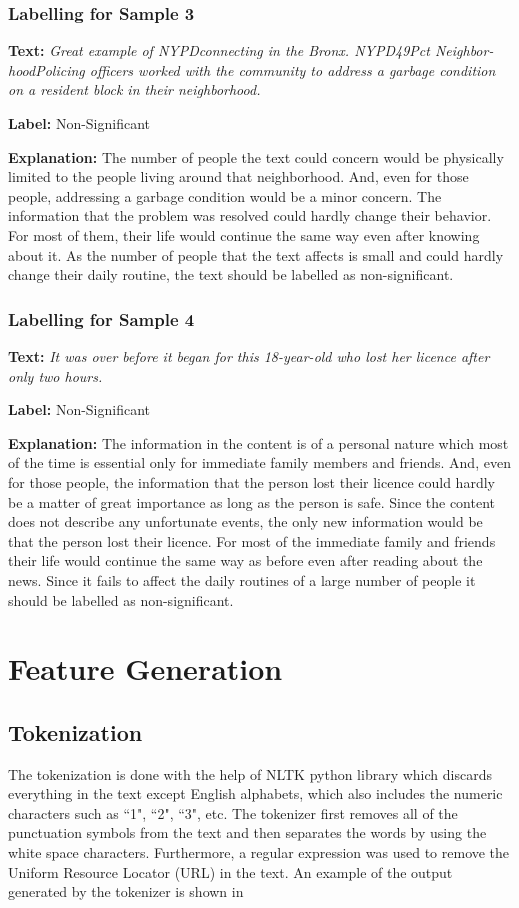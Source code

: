 \subsubsection{Labelling for Sample 3}
\textbf{Text:}
\textit{Great example of NYPDconnecting in the Bronx. NYPD49Pct Neighbor- hoodPolicing officers worked with the community to address a garbage condition on a resident block in their neighborhood.}\par
\textbf{Label:} Non-Significant\par
\textbf{Explanation:} The number of people the text could concern would be physically limited to the people living around that neighborhood. And, even for those people, addressing a garbage condition would be a minor concern. The information that the problem was resolved could hardly change their behavior. For most of them, their life would continue the same way even after knowing about it. As the number of people that the text affects is small and could hardly change their daily routine, the text should be labelled as non-significant.

\subsubsection{Labelling for Sample 4}
\textbf{Text:}
\textit{It was over before it began for this 18-year-old who lost her licence after only two hours.}\par
\textbf{Label:} Non-Significant\par
\textbf{Explanation:} The information in the content is of a personal nature which most of the time is essential only for immediate family members and friends. And, even for those people, the information that the person lost their licence could hardly be a matter of great importance as long as the person is safe. Since the content does not describe any unfortunate events, the only new information would be that the person lost their licence. For most of the immediate family and friends their life would continue the same way as before even after reading about the news. Since it fails to affect the daily routines of a large number of people it should be labelled as non-significant.

\section{Feature Generation}
\subsection{Tokenization}
The tokenization is done with the help of NLTK\cite{loper2002nltk} python library which discards everything in the text except English alphabets, which also includes the numeric characters such as ``1", ``2", ``3", etc.  The tokenizer first removes all of the punctuation symbols from the text and then separates the words by using the white space characters. Furthermore, a regular expression was used to remove the Uniform Resource Locator (URL) in the text. An example of the output generated by the tokenizer is shown in 


